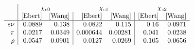 $$
\begin{array}{r|rr|rr|rr}
  &\multicolumn{2}{c}{\chi_{c0}} & \multicolumn{2}{c}{\chi_{c1}} & \multicolumn{2}{c}{\chi_{c2}} \\
   & \text{[Ebert]} & \text{[Wang]} & \text{[Ebert]} & \text{[Wang]} & \text{[Ebert]} & \text{[Wang]} \\
\hline
 e\nu & 0.0889 & 0.138 & 0.0822 & 0.115 & 0.16 & 0.0971 \\
 \pi & 0.0217 & 0.0349 & 0.000644 & 0.00281 & 0.041 & 0.0238 \\
 \rho & 0.0547 & 0.0901 & 0.0127 & 0.0269 & 0.105 & 0.0656 \\
\end{array}
$$